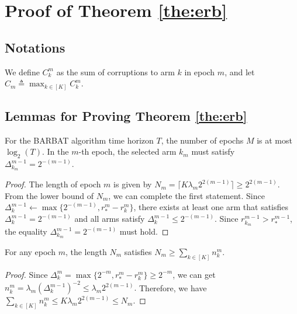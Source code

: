 \section{Proof of Theorem \ref{the:erb}}
\label{ape:mab}

\subsection{Notations}
We define $C_k^m$ as the sum of corruptions to arm $k$ in epoch $m$, and let $C_m \triangleq \max_{k \in [K]}C_k^m$.

\subsection{Lemmas for Proving Theorem \ref{the:erb}}

\begin{lemma}
\label{lem:tne} %
    For the BARBAT algorithm time horizon $T$, the number of epochs $M$ is at most $\log_2(T)$. In the $m$-th epoch, the selected arm $k_m$ must satisfy $\Delta_{k_m}^{m-1} = 2^{-(m-1)}$.
\end{lemma}
\begin{proof}
    The length of epoch $m$ is given by $ N_m = \lceil K \lambda_m 2^{2(m-1)} \rceil \geq 2^{2(m-1)}$. From the lower bound of $N_m$, we can complete the first statement. Since $\Delta_k^{m-1} \leftarrow \max\{2^{-(m-1)}, r_*^m - r_k^m\}$, there exists at least one arm that satisfies $\Delta_k^{m-1} = 2^{-(m-1)}$ and all arms satisfy $\Delta_k^{m-1} \leq 2^{-(m-1)}$. Since $r_{k_m}^{m-1} > r_{*}^{m-1}$, the equality $\Delta_{k_m}^{m-1} = 2^{-(m-1)}$ must hold.
\end{proof}

\begin{lemma}
\label{lem:rkc} %
    For any epoch $m$, the length $N_m$ satisfies $N_m \geq \sum_{k \in [K]} n_k^m$.
\end{lemma}
\begin{proof}
    Since $\Delta_k^m = \max \{2^{-m}, r_*^m - r_k^m\} \geq 2^{-m}$, we can get
    $n_k^m = \lambda_m (\Delta_k^{m-1})^{-2} \leq \lambda_m 2^{2(m-1)}.$
    Therefore, we have
    $\sum_{k \in [K]}n_k^m \leq K \lambda_m 2^{2(m-1)} \leq N_m.$
\end{proof}

